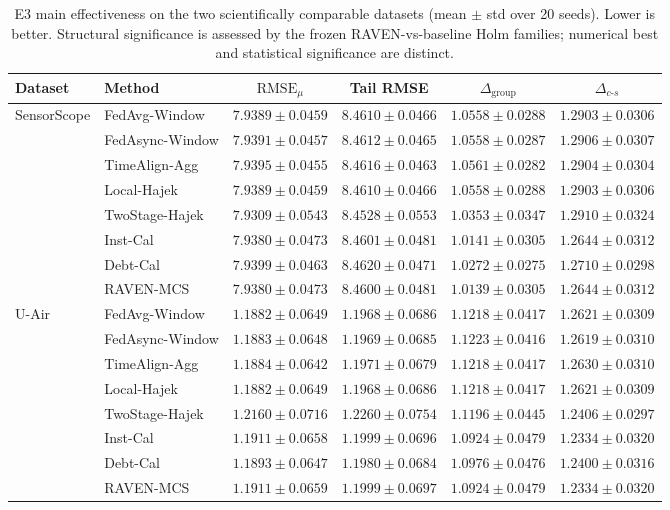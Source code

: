 \documentclass[letterpaper,journal]{IEEEtran}
\begin{document}
\begin{table}[t]
\centering
\caption{E3 main effectiveness on the two scientifically comparable datasets
(mean $\pm$ std over 20 seeds).  Lower is better.  Structural significance is
assessed by the frozen RAVEN-vs-baseline Holm families; numerical best and
statistical significance are distinct.}
\label{tab:main_effectiveness}
\setlength{\tabcolsep}{4.2pt}
\begin{tabular}{llcccc}
\hline
Dataset & Method & $\mathrm{RMSE}_{\mu}$ & Tail RMSE &
$\Delta_{\mathrm{group}}$ & $\Delta_{c\text{-}s}$\\
\hline
\multirow{8}{*}{SensorScope}
& FedAvg-Window    & $7.9389\pm0.0459$ & $8.4610\pm0.0466$ & $1.0558\pm0.0288$ & $1.2903\pm0.0306$\\
& FedAsync-Window  & $7.9391\pm0.0457$ & $8.4612\pm0.0465$ & $1.0558\pm0.0287$ & $1.2906\pm0.0307$\\
& TimeAlign-Agg    & $7.9395\pm0.0455$ & $8.4616\pm0.0463$ & $1.0561\pm0.0282$ & $1.2904\pm0.0304$\\
& Local-Hajek      & $7.9389\pm0.0459$ & $8.4610\pm0.0466$ & $1.0558\pm0.0288$ & $1.2903\pm0.0306$\\
& TwoStage-Hajek   & $\mathbf{7.9309}\pm0.0543$ & $\mathbf{8.4528}\pm0.0553$ & $1.0353\pm0.0347$ & $1.2910\pm0.0324$\\
& Inst-Cal         & $7.9380\pm0.0473$ & $8.4601\pm0.0481$ & $1.0141\pm0.0305$ & $1.2644\pm0.0312$\\
& Debt-Cal         & $7.9399\pm0.0463$ & $8.4620\pm0.0471$ & $1.0272\pm0.0275$ & $1.2710\pm0.0298$\\
& RAVEN-MCS        & $7.9380\pm0.0473$ & $8.4600\pm0.0481$ & $\mathbf{1.0139}\pm0.0305$ & $\mathbf{1.2644}\pm0.0312$\\
\hline
\multirow{8}{*}{U-Air}
& FedAvg-Window    & $\mathbf{1.1882}\pm0.0649$ & $\mathbf{1.1968}\pm0.0686$ & $1.1218\pm0.0417$ & $1.2621\pm0.0309$\\
& FedAsync-Window  & $1.1883\pm0.0648$ & $1.1969\pm0.0685$ & $1.1223\pm0.0416$ & $1.2619\pm0.0310$\\
& TimeAlign-Agg    & $1.1884\pm0.0642$ & $1.1971\pm0.0679$ & $1.1218\pm0.0417$ & $1.2630\pm0.0310$\\
& Local-Hajek      & $\mathbf{1.1882}\pm0.0649$ & $\mathbf{1.1968}\pm0.0686$ & $1.1218\pm0.0417$ & $1.2621\pm0.0309$\\
& TwoStage-Hajek   & $1.2160\pm0.0716$ & $1.2260\pm0.0754$ & $1.1196\pm0.0445$ & $1.2406\pm0.0297$\\
& Inst-Cal         & $1.1911\pm0.0658$ & $1.1999\pm0.0696$ & $1.0924\pm0.0479$ & $1.2334\pm0.0320$\\
& Debt-Cal         & $1.1893\pm0.0647$ & $1.1980\pm0.0684$ & $1.0976\pm0.0476$ & $1.2400\pm0.0316$\\
& RAVEN-MCS        & $1.1911\pm0.0659$ & $1.1999\pm0.0697$ & $\mathbf{1.0924}\pm0.0479$ & $\mathbf{1.2334}\pm0.0320$\\
\hline
\end{tabular}
\end{table}
\end{document}
